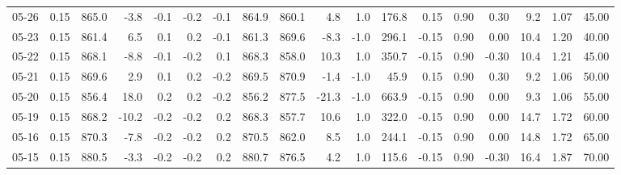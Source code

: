 \begin{threeparttable}
{\begin{tabular}{lrrrrrrrrrrrrrrrrr}
  05-26 &     0.15 & 865.0 &              -3.8 &              -0.1 &               -0.2 &               -0.1 & 864.9 & 860.1 &        4.8 &                      1.0 &               176.8 &       0.15 &      0.90 &           0.30 &              9.2 &            1.07 &                  45.00 \\
  05-23 &     0.15 & 861.4 &               6.5 &               0.1 &                0.2 &               -0.1 & 861.3 & 869.6 &       -8.3 &                     -1.0 &               296.1 &      -0.15 &      0.90 &           0.00 &             10.4 &            1.20 &                  40.00 \\
  05-22 &     0.15 & 868.1 &              -8.8 &              -0.1 &               -0.2 &                0.1 & 868.3 & 858.0 &       10.3 &                      1.0 &               350.7 &      -0.15 &      0.90 &          -0.30 &             10.4 &            1.21 &                  45.00 \\
  05-21 &     0.15 & 869.6 &               2.9 &               0.1 &                0.2 &               -0.2 & 869.5 & 870.9 &       -1.4 &                     -1.0 &                45.9 &       0.15 &      0.90 &           0.30 &              9.2 &            1.06 &                  50.00 \\
  05-20 &     0.15 & 856.4 &              18.0 &               0.2 &                0.2 &               -0.2 & 856.2 & 877.5 &      -21.3 &                     -1.0 &               663.9 &      -0.15 &      0.90 &           0.00 &              9.3 &            1.06 &                  55.00 \\
  05-19 &     0.15 & 868.2 &             -10.2 &              -0.2 &               -0.2 &                0.2 & 868.3 & 857.7 &       10.6 &                      1.0 &               322.0 &      -0.15 &      0.90 &           0.00 &             14.7 &            1.72 &                  60.00 \\
  05-16 &     0.15 & 870.3 &              -7.8 &              -0.2 &               -0.2 &                0.2 & 870.5 & 862.0 &        8.5 &                      1.0 &               244.1 &      -0.15 &      0.90 &           0.00 &             14.8 &            1.72 &                  65.00 \\
  05-15 &     0.15 & 880.5 &              -3.3 &              -0.2 &               -0.2 &                0.2 & 880.7 & 876.5 &        4.2 &                      1.0 &               115.6 &      -0.15 &      0.90 &          -0.30 &             16.4 &            1.87 &                  70.00 \\

\end{tabular}}
\end{threeparttable}
